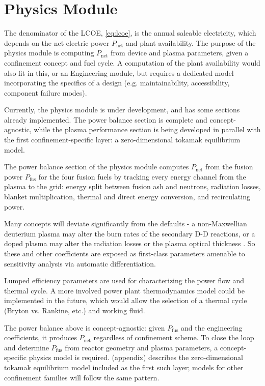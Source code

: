 \documentclass{article}
\begin{document}
\section{Physics Module}
\label{sec:physics-module}

The denominator of the LCOE, \cref{eq:lcoe}, is the annual saleable
electricity, which depends on the net electric power $P_{\text{net}}$ and plant availability.
The purpose of the physics module is computing $P_{\text{net}}$ from
device and plasma parameters, given a confinement concept and fuel cycle.
A computation of the plant availability would also fit in this, or an Engineering module,
but requires a dedicated model incorporating the specifics of a design (e.g. maintainability, accessibility, component failure modes).

Currently, the physics module is under development, and has some sections
already implemented. The power balance section is complete and concept-agnostic,
while the plasma performance section is being developed in parallel with the
first confinement-specific layer: a zero-dimensional tokamak equilibrium model.

The power balance section of the physics module computes $P_{\text{net}}$
from the fusion power $P_{\text{fus}}$ for the four fusion fuels by tracking
every energy channel from the plasma to the grid: energy split between fusion ash and neutrons,
radiation losses, blanket multiplication, thermal and direct energy conversion, and
recirculating power.

Many concepts will deviate significantly from the defaults - a non-Maxwellian
deuterium plasma may alter the burn rates of the secondary D-D reactions,
or a doped plasma may alter the radiation losses or the plasma optical thickness
\citep{frank2022}. So these and other coefficients are exposed as first-class
parameters amenable to sensitivity analysis via automatic differentiation.

Lumped efficiency parameters are used for characterizing the power flow and thermal cycle.
A more involved power plant thermodynamics model could be implemented in the future,
which would allow the selection of a thermal cycle (Bryton vs. Rankine, etc.) and working
fluid.

The power balance above is concept-agnostic: given $P_{\text{fus}}$
and the engineering coefficients, it produces $P_{\text{net}}$
regardless of confinement scheme. To close the loop and determine
$P_{\text{fus}}$ from reactor geometry and plasma parameters, a
concept-specific physics model is required.
 (appendix) describes the zero-dimensional tokamak
equilibrium model included as the first such layer; models for other
confinement families will follow the same pattern.
\end{document}
